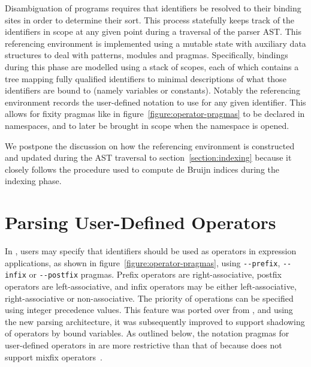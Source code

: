 Disambiguation of \Beluga programs requires that identifiers be resolved to their binding sites in order to determine their sort.
This process statefully keeps track of the identifiers in scope at any given point during a traversal of the parser \ac{AST}.
This referencing environment is implemented using a mutable state with auxiliary data structures to deal with patterns, modules and pragmas.
Specifically, bindings during this phase are modelled using a stack of scopes, each of which contains a tree mapping fully qualified identifiers to minimal descriptions of what those identifiers are bound to (namely variables or constants).
Notably the referencing environment records the user-defined notation to use for any given identifier.
This allows for fixity pragmas like in figure~\ref{figure:operator-pragmas} to be declared in namespaces, and to later be brought in scope when the namespace is opened.

We postpone the discussion on how the referencing environment is constructed and updated during the \ac{AST} traversal to section~\ref{section:indexing} because it closely follows the procedure used to compute de Bruijn indices during the indexing phase.



\section{Parsing User-Defined Operators}\label{section:parsing-user-defined-operators}

In \Beluga, users may specify that identifiers should be used as operators in expression applications, as shown in figure~\ref{figure:operator-pragmas}, using \verb|--prefix|, \verb|--infix| or \verb|--postfix| pragmas.
Prefix operators are right-associative, postfix operators are left-associative, and infix operators may be either left-associative, right-associative or non-associative.
The priority of operations can be specified using integer precedence values.
This feature was ported over from \Twelf, and using the new parsing architecture, it was subsequently improved to support shadowing of operators by bound variables.
As outlined below, the notation pragmas for user-defined operators in \Beluga are more restrictive than that of \Agda because \Beluga does not support mixfix operators~\cite{danielsson2008parsing}.

